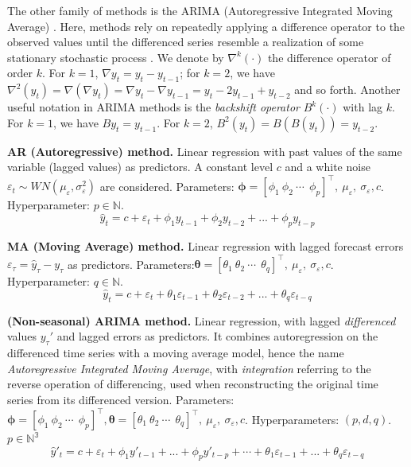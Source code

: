 The other family of methods is the ARIMA (Autoregressive Integrated Moving Average) \cite{box1970distribution}.
Here, methods rely on repeatedly applying a difference operator to the observed values until the differenced series resemble a realization of some stationary stochastic process \cite{brockwell1990methods}.
We denote by $\nabla^k(\cdot)$ the difference operator of order $k$.
For $k=1$, $\nabla y_t = y_t - y_{t-1}$; for $k=2$, we have $\nabla^2(y_t) = \nabla(\nabla y_t) = \nabla y_t - \nabla y_{t-1} = y_t -2y_{t-1} + y_{t-2}$ and so forth.
Another useful notation in ARIMA methods is the \textit{backshift operator} $B^k(\cdot)$ with lag $k$.
For $k=1$, we have $B y_t = y_{t-1}$.
For $k=2$, $B^2(y_t) = B(B(y_t)) = y_{t-2}$.

\vspace{1em}
\noindent
\textbf{AR (Autoregressive) method.}  Linear regression with past values of the same variable (lagged values) as predictors.
A constant level $c$ and a white noise $\varepsilon_t \sim WN(\mu_\varepsilon, \sigma^2_\varepsilon)$ are considered.
Parameters: $\boldsymbol{\phi} = [\phi_1 \ \phi_2 \ \cdots \ \ \phi_p]^\top, \ \mu_\varepsilon, \ \sigma_\varepsilon, c$.
Hyperparameter: $p \in \mathbb{N}$.
\begin{equation}\label{eq:ar}
\hat{y}_t = c + \varepsilon_t + \phi_1 y_{t-1} + \phi_2 y_{t-2} + ... + \phi_p y_{t-p}
\end{equation}

\noindent
\textbf{MA (Moving Average) method.} Linear regression with lagged forecast errors $\varepsilon_\tau = \hat{y}_\tau - y_\tau$ as predictors.
Parameters:$\boldsymbol{\theta} = [\theta_1 \ \theta_2 \ \cdots \ \ \theta_q]^\top, \ \mu_\varepsilon, \ \sigma_\varepsilon, c$.
Hyperparameter: $q \in \mathbb{N}$.
\begin{equation}\label{eq:ma}
    \hat{y}_t = c + \varepsilon_{t} + \theta_1 \varepsilon_{t-1} + \theta_2 \varepsilon_{t-2} + ... + \theta_q \varepsilon_{t-q}
\end{equation}

\noindent
\textbf{(Non-seasonal) ARIMA method.} Linear regression, with lagged \textit{differenced} values $y_\tau'$ and lagged errors as predictors.
It combines autoregression on the differenced time series with a moving average model, hence the name \textit{Autoregressive Integrated Moving Average}, with \textit{integration} referring to the reverse operation of differencing, used when reconstructing the original time series from its differenced version.
Parameters: $\boldsymbol{\phi} = [\phi_1 \ \phi_2 \ \cdots \ \ \phi_p]^\top,\boldsymbol{\theta} = [\theta_1 \ \theta_2 \ \cdots \ \ \theta_q]^\top, \ \mu_\varepsilon, \ \sigma_\varepsilon, c$.
Hyperparameters: $(p, d, q)$. $p \in \mathbb{N^3}$
\begin{equation}\label{eq:arima}
\hat{y}'_t = c + \varepsilon_t + \phi_1 y'_{t-1} + ... + \phi_p y'_{t-p} + \cdots + \theta_1 \varepsilon_{t-1} + ... + \theta_q \varepsilon_{t-q}
\end{equation}

